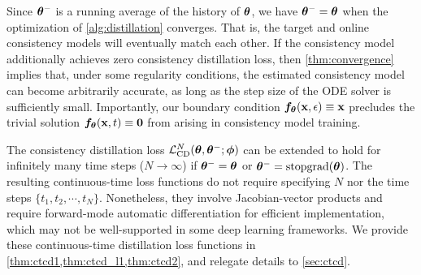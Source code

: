 Since ${\bm{\theta}}^{-}$ is a running average of the history of ${\bm{\theta}}$, we have ${\bm{\theta}}^{-} = {\bm{\theta}}$ when the optimization of \cref{alg:distillation} converges. That is, the target and online consistency models will eventually match each other. If the consistency model additionally achieves zero consistency distillation loss, then \cref{thm:convergence} implies that, under some regularity conditions, the estimated consistency model can become arbitrarily accurate, as long as the step size of the ODE solver is sufficiently small. Importantly, our boundary condition ${\bm{f}}_{\bm{\theta}}({\mathbf{x}}, \epsilon) \equiv {\mathbf{x}}$ precludes the trivial solution ${\bm{f}}_{\bm{\theta}}({\mathbf{x}}, t) \equiv \bm{0}$ from arising in consistency model training.

The consistency distillation loss $\mathcal{L}_\text{CD}^N({\bm{\theta}}, {\bm{\theta}}^{-}; {\bm{\phi}})$ can be extended to hold for infinitely many time steps ($N \to \infty$) if ${\bm{\theta}}^{-} = {\bm{\theta}}$ or ${\bm{\theta}}^{-} = \operatorname{stopgrad}({\bm{\theta}})$. The resulting continuous-time loss functions do not require specifying $N$ nor the time steps $\{t_1, t_2, \cdots, t_N\}$. Nonetheless, they involve Jacobian-vector products and require forward-mode automatic differentiation for efficient implementation, which may not be well-supported in some deep learning frameworks. We provide these continuous-time distillation loss functions in \cref{thm:ctcd1,thm:ctcd_l1,thm:ctcd2}, and relegate details to \cref{sec:ctcd}.
